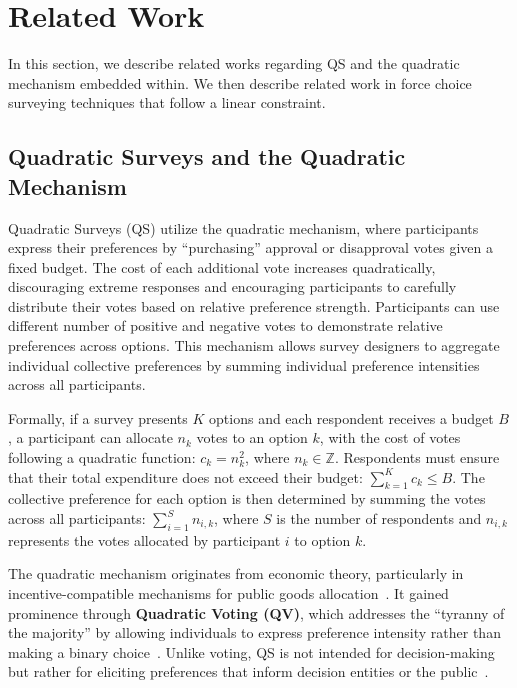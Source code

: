 \section{Related Work}
\label{sec:relatedWorks}
In this section, we describe related works regarding QS and the quadratic mechanism embedded within. We then describe related work in force choice surveying techniques that follow a linear constraint.

\subsection{Quadratic Surveys and the Quadratic Mechanism}
Quadratic Surveys (QS) utilize the quadratic mechanism, where participants express their preferences by ``purchasing'' approval or disapproval votes given a fixed budget. The cost of each additional vote increases quadratically, discouraging extreme responses and encouraging participants to carefully distribute their votes based on relative preference strength. Participants can use different number of positive and negative votes to demonstrate relative preferences across options. This mechanism allows survey designers to aggregate individual collective preferences by summing individual preference intensities across all participants.

Formally, if a survey presents $K$ options and each respondent receives a budget $B$, a participant can allocate $n_k$ votes to an option $k$, with the cost of votes following a quadratic function: $c_k = n_k^2$, where $n_k \in \mathbb{Z}$. Respondents must ensure that their total expenditure does not exceed their budget: $\sum_{k=1}^{K} c_k \leq B$. The collective preference for each option is then determined by summing the votes across all participants: $\sum_{i=1}^{S} n_{i,k}$, where $S$ is the number of respondents and $n_{i,k}$ represents the votes allocated by participant $i$ to option $k$.

The quadratic mechanism originates from economic theory, particularly in incentive-compatible mechanisms for public goods allocation~\cite{grovesOptimalAllocationPublic1977}. It gained prominence through \textbf{Quadratic Voting (QV)}, which addresses the ``tyranny of the majority'' by allowing individuals to express preference intensity rather than making a binary choice~\cite{posner2018radical}. Unlike voting, QS is not intended for decision-making but rather for eliciting preferences that inform decision entities or the public~\cite{chengOrganizeThenVote2025}.

